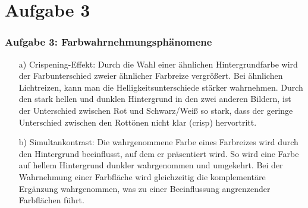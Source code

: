 \documentclass[accentcolor=tud9c,colorbacktitle,inverttitle,landscape,german,presentation,t]{tudbeamer}
\begin{document}
\section{Aufgabe 3}
	\begin{frame}
		\frametitle{Aufgabe 3: Farbwahrnehmungsphänomene}
		\begin{itemize}
			\item[a)]Crispening-Effekt: Durch die Wahl einer ähnlichen Hintergrundfarbe wird der Farbunterschied zweier ähnlicher Farbreize vergrößert. Bei ähnlichen Lichtreizen, kann man die Helligkeitsunterschiede stärker wahrnehmen. Durch den stark hellen und dunklen Hintergrund in den zwei anderen Bildern, ist der Unterschied zwischen Rot und Schwarz/Weiß so stark, dass der geringe Unterschied zwischen den Rottönen nicht klar (crisp) hervortritt.
			\item[b)]Simultankontrast: Die wahrgenommene Farbe eines Farbreizes wird durch den Hintergrund beeinflusst, auf dem er präsentiert wird. So wird eine Farbe auf hellem Hintergrund dunkler wahrgenommen und umgekehrt. Bei der Wahrnehmung einer Farbfläche wird gleichzeitig die komplementäre Ergänzung wahrgenommen, was zu einer  Beeinflussung angrenzender Farbflächen führt.
		\end{itemize}
	\end{frame}
\end{document}
